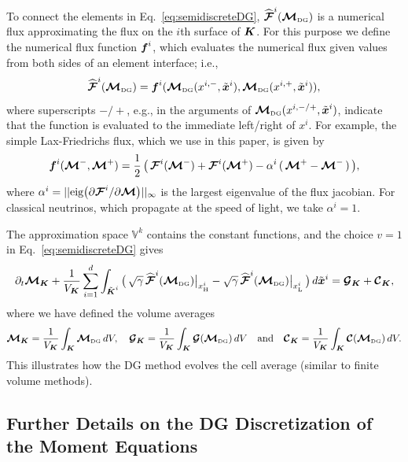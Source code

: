 \documentclass[10pt,preprint]{aastex}
\newcommand{\sumx}{\sum_{i=1}^{d}}
\begin{document}
To connect the elements in Eq.~\eqref{eq:semidiscreteDG}, $\widehat{\boldsymbol{\mathcal{F}}}^{i}(\boldsymbol{\mathcal{M}}_{\mbox{\tiny DG}})$ is a numerical flux approximating the flux on the $i$th surface of $\boldsymbol{K}$.  
For this purpose we define the numerical flux function $\boldsymbol{f}^{i}$, which evaluates the numerical flux given values from both sides of an element interface; i.e.,
\begin{equation}
  \widehat{\boldsymbol{\mathcal{F}}}^{i}(\boldsymbol{\mathcal{M}}_{\mbox{\tiny DG}})=\boldsymbol{f}^{i}(\boldsymbol{\mathcal{M}}_{\mbox{\tiny DG}}(x^{i,-},\tilde{\boldsymbol{x}}^{i}),\boldsymbol{\mathcal{M}}_{\mbox{\tiny DG}}(x^{i,+},\tilde{\boldsymbol{x}}^{i})),
\end{equation}
where superscripts $-/+$, e.g., in the arguments of $\boldsymbol{\mathcal{M}}_{\mbox{\tiny DG}}(x^{i,-/+},\tilde{\boldsymbol{x}}^{i})$, indicate that the function is evaluated to the immediate left/right of $x^{i}$.  
For example, the simple Lax-Friedrichs flux, which we use in this paper, is given by
\begin{equation}
  \boldsymbol{f}^{i}(\boldsymbol{\mathcal{M}}^{-},\boldsymbol{\mathcal{M}}^{+})
  =\frac{1}{2}\,\big(\,\boldsymbol{\mathcal{F}}^{i}(\boldsymbol{\mathcal{M}}^{-})+\boldsymbol{\mathcal{F}}^{i}(\boldsymbol{\mathcal{M}}^{+})-\alpha^{i}\,(\,\boldsymbol{\mathcal{M}}^{+}-\boldsymbol{\mathcal{M}}^{-}\,)\,\big),
\end{equation}
where $\alpha^{i}=||\mbox{eig}\big(\partial\boldsymbol{\mathcal{F}}^{i}/\partial\boldsymbol{\mathcal{M}}\big)||_{\infty}$ is the largest eigenvalue of the flux jacobian.  
For classical neutrinos, which propagate at the speed of light, we take $\alpha^{i}=1$.  

The approximation space $\mathbb{V}^{k}$ contains the constant functions, and the choice $v=1$ in Eq.~\eqref{eq:semidiscreteDG} gives
\begin{equation}
  \partial_{t}\bcM_{\bK}
  +\f{1}{V_{\bK}}\sumx\int_{\tilde{\bK}^{i}}
  \big(\,\sqrt{\gamma}\,\widehat{\bcF}^{i}(\bcM_{\DG})\big|_{\xH^{i}}-\sqrt{\gamma}\,\widehat{\bcF}^{i}(\bcM_{\DG})\big|_{\xL^{i}}\,\big)\,d\tilde{\bx}^{i}
  =\bcG_{\bK}+\bcC_{\bK},
\end{equation}
where we have defined the volume averages
\begin{equation}
  \boldsymbol{\mathcal{M}}_{\boldsymbol{K}}=\frac{1}{V_{\boldsymbol{K}}}\int_{\boldsymbol{K}}\boldsymbol{\mathcal{M}}_{\mbox{\tiny DG}}\,dV, \quad
  \boldsymbol{\mathcal{G}}_{\boldsymbol{K}}=\frac{1}{V_{\boldsymbol{K}}}\int_{\boldsymbol{K}}\boldsymbol{\mathcal{G}}(\boldsymbol{\mathcal{M}}_{\mbox{\tiny DG}})\,dV  \quad\text{and}\quad
  \boldsymbol{\mathcal{C}}_{\boldsymbol{K}}=\frac{1}{V_{\boldsymbol{K}}}\int_{\boldsymbol{K}}\boldsymbol{\mathcal{C}}(\boldsymbol{\mathcal{M}}_{\mbox{\tiny DG}})\,dV.
\end{equation}
This illustrates how the DG method evolves the cell average (similar to finite volume methods).  

\subsection{Further Details on the DG Discretization of the Moment Equations}
\end{document}
